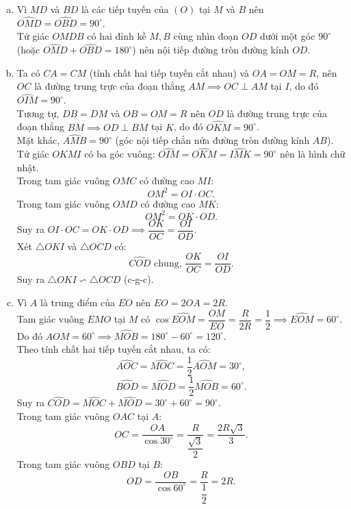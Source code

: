 \begin{bt}
{\begin{enumerate}[a)]
    \item Vì $MD$ và $BD$ là các tiếp tuyến của $(O)$ tại $M$ và $B$ nên $\widehat{OMD} = \widehat{OBD} = 90^\circ$.\\
    Tứ giác $OMDB$ có hai đỉnh kề $M, B$ cùng nhìn đoạn $OD$ dưới một góc $90^\circ$ (hoặc $\widehat{OMD} + \widehat{OBD} = 180^\circ$) nên nội tiếp đường tròn đường kính $OD$.
    \item Ta có $CA = CM$ (tính chất hai tiếp tuyến cắt nhau) và $OA = OM = R$, nên $OC$ là đường trung trực của đoạn thẳng $AM \implies OC \perp AM$ tại $I$, do đó $\widehat{OIM} = 90^\circ$.\\
    Tương tự, $DB = DM$ và $OB = OM = R$ nên $OD$ là đường trung trực của đoạn thẳng $BM \implies OD \perp BM$ tại $K$, do đó $\widehat{OKM} = 90^\circ$.\\
    Mặt khác, $\widehat{AMB} = 90^\circ$ (góc nội tiếp chắn nửa đường tròn đường kính $AB$).\\
    Tứ giác $OKMI$ có ba góc vuông: $\widehat{OIM} = \widehat{OKM} = \widehat{IMK} = 90^\circ$ nên là hình chữ nhật.\\
    Trong tam giác vuông $OMC$ có đường cao $MI$:
    $$OM^2 = OI \cdot OC.$$
    Trong tam giác vuông $OMD$ có đường cao $MK$:
    $$OM^2 = OK \cdot OD.$$
    Suy ra $OI \cdot OC = OK \cdot OD \implies \dfrac{OK}{OC} = \dfrac{OI}{OD}$.\\
    Xét $\triangle OKI$ và $\triangle OCD$ có:
    $$\widehat{COD}\text{ chung, } \dfrac{OK}{OC} = \dfrac{OI}{OD}.$$
    Suy ra $\triangle OKI \backsim \triangle OCD$ (c-g-c).
    \item Vì $A$ là trung điểm của $EO$ nên $EO = 2OA = 2R$.\\
    Tam giác vuông $EMO$ tại $M$ có $\cos \widehat{EOM} = \dfrac{OM}{EO} = \dfrac{R}{2R} = \dfrac{1}{2} \implies \widehat{EOM} = 60^\circ$.\\
    Do đó $\widehat{AOM} = 60^\circ \implies \widehat{MOB} = 180^\circ - 60^\circ = 120^\circ$.\\
    Theo tính chất hai tiếp tuyến cắt nhau, ta có:
    $$\widehat{AOC} = \widehat{MOC} = \dfrac{1}{2}\widehat{AOM} = 30^\circ,$$
    $$\widehat{BOD} = \widehat{MOD} = \dfrac{1}{2}\widehat{MOB} = 60^\circ.$$
    Suy ra $\widehat{COD} = \widehat{MOC} + \widehat{MOD} = 30^\circ + 60^\circ = 90^\circ$.\\
    Trong tam giác vuông $OAC$ tại $A$:
    $$OC = \dfrac{OA}{\cos 30^\circ} = \dfrac{R}{\dfrac{\sqrt{3}}{2}} = \dfrac{2R\sqrt{3}}{3}.$$
    Trong tam giác vuông $OBD$ tại $B$:
    $$OD = \dfrac{OB}{\cos 60^\circ} = \dfrac{R}{\dfrac{1}{2}} = 2R.$$

\end{enumerate}}
\end{bt}
